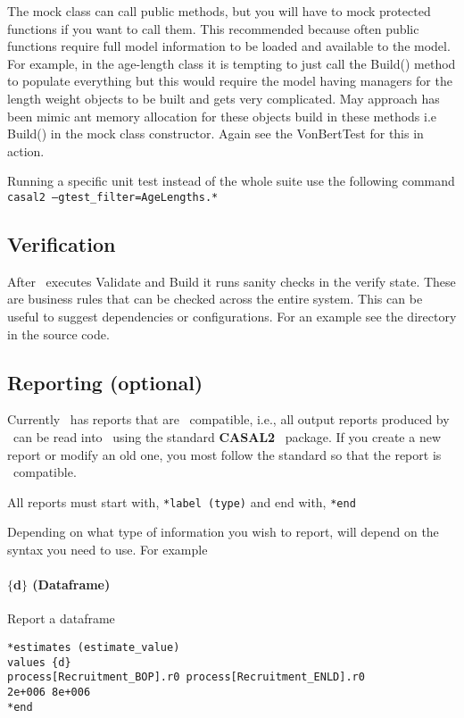The mock class can call public methods, but you will have to mock protected functions if you want to call them. This recommended because often public functions require full model information to be loaded and available to the model. For example, in the age-length class it is tempting to just call the Build() method to populate everything but this would require the model having managers for the length weight objects to be built and gets very complicated. May approach has been mimic ant memory allocation for these objects build in these methods i.e Build() in the mock class constructor. Again see the VonBertTest for this in action.

Running a specific unit test instead of the whole suite use the following command \texttt{casal2 --gtest\_filter=AgeLengths.*}

\subsection{Verification}
After \CNAME\ executes Validate and Build it runs sanity checks in the verify state. These are business rules that can be checked across the entire system. This can be useful to suggest dependencies or configurations. For an example see the directory  in the source code. 

\subsection{Reporting (optional)}

Currently \CNAME\ has reports that are \R\ compatible, i.e., all output reports produced by \CNAME\ can be read into \R\ using the standard  \textbf{CASAL2} \R\ package. If you create a new report or modify an old one, you most follow the standard so that the report is \R\ compatible.

All reports must start with,
\texttt{*label (type)}
and end with,
\texttt{*end}

Depending on what type of information you wish to report, will depend on the syntax you need to use. For example

\paragraph*{$\{$d$\}$ (Dataframe)}
Report a dataframe
{\small{\begin{verbatim}
*estimates (estimate_value)
values {d}
process[Recruitment_BOP].r0 process[Recruitment_ENLD].r0 
2e+006 8e+006
*end
\end{verbatim}}}


